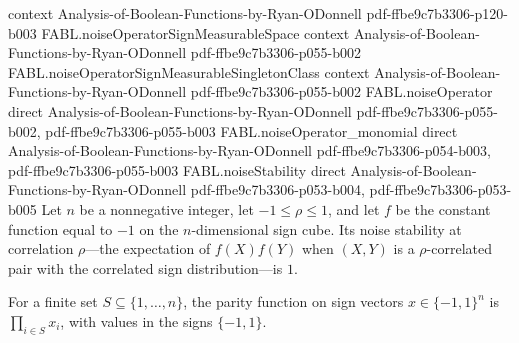\begin{theorem}
  {context}
  {Analysis-of-Boolean-Functions-by-Ryan-ODonnell}
  {pdf-ffbe9c7b3306-p120-b003}
\proofstep
  {FABL.noiseOperatorSignMeasurableSpace}
  {context}
  {Analysis-of-Boolean-Functions-by-Ryan-ODonnell}
  {pdf-ffbe9c7b3306-p055-b002}
\proofstep
  {FABL.noiseOperatorSignMeasurableSingletonClass}
  {context}
  {Analysis-of-Boolean-Functions-by-Ryan-ODonnell}
  {pdf-ffbe9c7b3306-p055-b002}
\proofstep
  {FABL.noiseOperator}
  {direct}
  {Analysis-of-Boolean-Functions-by-Ryan-ODonnell}
  {pdf-ffbe9c7b3306-p055-b002,
    pdf-ffbe9c7b3306-p055-b003}
\proofstep
  {FABL.noiseOperator_monomial}
  {direct}
  {Analysis-of-Boolean-Functions-by-Ryan-ODonnell}
  {pdf-ffbe9c7b3306-p054-b003,
    pdf-ffbe9c7b3306-p055-b003}
\proofstep
  {FABL.noiseStability}
  {direct}
  {Analysis-of-Boolean-Functions-by-Ryan-ODonnell}
  {pdf-ffbe9c7b3306-p053-b004,
    pdf-ffbe9c7b3306-p053-b005}
Let $n$ be a nonnegative integer, let $-1\leq\rho\leq1$, and let $f$ be the constant
function equal to $-1$ on the $n$-dimensional sign cube. Its noise stability at
correlation $\rho$—the expectation of $f(X)f(Y)$ when $(X,Y)$ is a $\rho$-correlated pair with the
correlated sign distribution—is $1$.
\end{theorem}

\begin{definition}
\label{FABL.parityFunction}
\leanok
{}
For a finite set $S\subseteq\{1,\ldots,n\}$, the parity function on sign vectors
$x\in\{-1,1\}^n$ is $\prod_{i\in S}x_i$, with values in the signs $\{-1,1\}$.
\end{definition}

